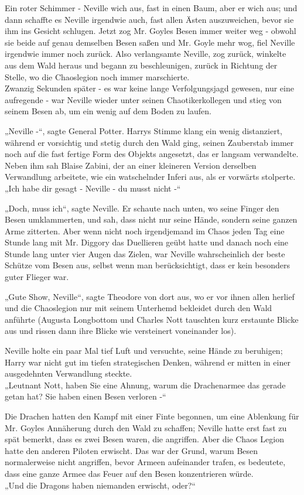 {Ein roter Schimmer - Neville wich aus, fast in einen Baum, aber er wich aus; und dann schaffte es Neville irgendwie auch, fast allen Ästen auszuweichen, bevor sie ihm ins Gesicht schlugen. Jetzt zog Mr. Goyles Besen immer weiter weg - obwohl sie beide auf genau demselben Besen saßen und Mr. Goyle mehr wog, fiel Neville irgendwie immer noch zurück. Also verlangsamte Neville, zog zurück, winkelte aus dem Wald heraus und begann zu beschleunigen, zurück in Richtung der Stelle, wo die Chaoslegion noch immer marschierte.\\ Zwanzig Sekunden später - es war keine lange Verfolgungsjagd gewesen, nur eine aufregende - war Neville wieder unter seinen Chaotikerkollegen und stieg von seinem Besen ab, um ein wenig auf dem Boden zu laufen.

„Neville -“, sagte General Potter. Harrys Stimme klang ein wenig distanziert, während er vorsichtig und stetig durch den Wald ging, seinen Zauberstab immer noch auf die fast fertige Form des Objekts angesetzt, das er langsam verwandelte. Neben ihm sah Blaise Zabini, der an einer kleineren Version derselben Verwandlung arbeitete, wie ein watschelnder Inferi aus, als er vorwärts stolperte.\\ „Ich habe dir gesagt - Neville - du musst nicht -“

„Doch, muss ich“, sagte Neville. Er schaute nach unten, wo seine Finger den Besen umklammerten, und sah, dass nicht nur seine Hände, sondern seine ganzen Arme zitterten. Aber wenn nicht noch irgendjemand im Chaos jeden Tag eine Stunde lang mit Mr. Diggory das Duellieren geübt hatte und danach noch eine Stunde lang unter vier Augen das Zielen, war Neville wahrscheinlich der beste Schütze vom Besen aus, selbst wenn man berücksichtigt, dass er kein besonders guter Flieger war.

„Gute Show, Neville“, sagte Theodore von dort aus, wo er vor ihnen allen herlief und die Chaoslegion nur mit seinem Unterhemd bekleidet durch den Wald anführte (Augusta Longbottom und Charles Nott tauschten kurz erstaunte Blicke aus und rissen dann ihre Blicke wie versteinert voneinander los).

Neville holte ein paar Mal tief Luft und versuchte, seine Hände zu beruhigen; Harry war nicht gut im tiefen strategischen Denken, während er mitten in einer ausgedehnten Verwandlung steckte.\\ „Leutnant Nott, haben Sie eine Ahnung, warum die Drachenarmee das gerade getan hat? Sie haben einen Besen verloren -“

Die Drachen hatten den Kampf mit einer Finte begonnen, um eine Ablenkung für Mr. Goyles Annäherung durch den Wald zu schaffen; Neville hatte erst fast zu spät bemerkt, dass es zwei Besen waren, die angriffen. Aber die Chaos Legion hatte den anderen Piloten erwischt. Das war der Grund, warum Besen normalerweise nicht angriffen, bevor Armeen aufeinander trafen, es bedeutete, dass eine ganze Armee das Feuer auf den Besen konzentrieren würde.\\ „Und die Dragons haben niemanden erwischt, oder?“

}
